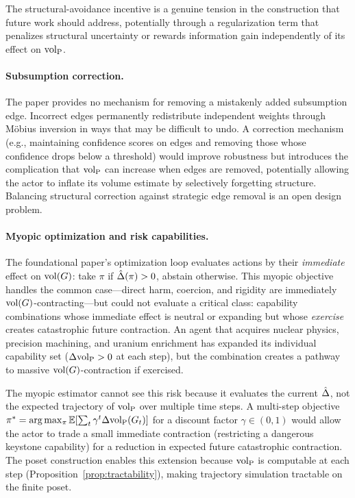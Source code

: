 The structural-avoidance incentive is a genuine tension in the construction
that future work should address, potentially through a regularization term
that penalizes structural uncertainty or rewards information gain independently
of its effect on ${\operatorname{vol}_{\mathrm{P}}}$.

\paragraph{Subsumption correction.} The paper provides no mechanism for
removing a mistakenly added subsumption edge. Incorrect edges permanently
redistribute independent weights through M\"{o}bius inversion in ways that
may be difficult to undo. A correction mechanism (e.g., maintaining confidence
scores on edges and removing those whose confidence drops below a threshold)
would improve robustness but introduces the complication that ${\operatorname{vol}_{\mathrm{P}}}$ can
increase when edges are removed, potentially allowing the actor to inflate
its volume estimate by selectively forgetting structure. Balancing structural
correction against strategic edge removal is an open design problem.

\paragraph{Myopic optimization and risk capabilities.} The foundational paper's
optimization loop evaluates actions by their \emph{immediate} effect on
$\operatorname{vol}(G)$: take $\pi$ if $\hat{\Delta}(\pi) > 0$, abstain otherwise. This myopic
objective handles the common case---direct harm, coercion, and rigidity are
immediately $\operatorname{vol}(G)$-contracting---but could not evaluate a critical class:
capability combinations whose immediate effect is neutral or expanding but
whose \emph{exercise} creates catastrophic future contraction. An agent that
acquires nuclear physics, precision machining, and uranium enrichment has
expanded its individual capability set ($\Delta {\operatorname{vol}_{\mathrm{P}}} > 0$ at each step), but
the combination creates a pathway to massive $\operatorname{vol}(G)$-contraction if
exercised.

The myopic estimator cannot see this risk because it evaluates the current
$\hat{\Delta}$, not the expected trajectory of ${\operatorname{vol}_{\mathrm{P}}}$ over multiple time steps.
A multi-step objective $\pi^* = \arg\max_\pi \mathbb{E}[\sum_t \gamma^t
\Delta {\operatorname{vol}_{\mathrm{P}}}(G_t)]$ for a discount factor $\gamma \in (0, 1)$ would allow
the actor to trade a small immediate contraction (restricting a dangerous
keystone capability) for a reduction in expected future catastrophic
contraction. The poset construction enables this extension because ${\operatorname{vol}_{\mathrm{P}}}$ is
computable at each step (Proposition~\ref{prop:tractability}), making
trajectory simulation tractable on the finite poset.

